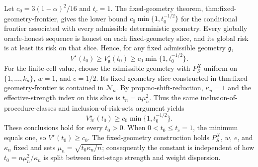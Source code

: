 Let \(c_0=3(1-\alpha)^2/16\) and \(t_c=1\).  The fixed-geometry theorem, thm:fixed-geometry-frontier, gives the lower bound \(c_0\min\{1,t_0^{-1/2}\}\) for the conditional frontier associated with every admissible deterministic geometry.  Every globally oracle-honest sequence is honest on each fixed-geometry slice, and its global risk is at least its risk on that slice.  Hence, for any fixed admissible geometry \(\mathfrak g\),
\[
 V^\star(t_0)\ge V_{\mathfrak g}^\star(t_0)\ge c_0\min\{1,t_0^{-1/2}\}.
\]
For the finite-cell value, choose the admissible geometry with \(P_S^X\) uniform on \(\{1,\ldots,k_n\}\), \(w=1\), and \(e=1/2\).  Its fixed-geometry slice constructed in thm:fixed-geometry-frontier is contained in \(\mathcal N_n\).  By prop:no-shift-reduction, \(\kappa_n=1\) and the effective-strength index on this slice is \(t_n=n\mu_n^2\).  Thus the same inclusion-of-procedure-classes and inclusion-of-risk-sets argument yields
\[
 V_{\mathcal N}^\star(t_0)\ge c_0\min\{1,t_0^{-1/2}\}.
\]
These conclusions hold for every \(t_0>0\).  When \(0<t_0\le t_c=1\), the minimum equals one, so \(V^\star(t_0)\ge c_0\).  The fixed-geometry construction holds \(P_S^X\), \(w\), \(e\), and \(\kappa_n\) fixed and sets \(\mu_n=\sqrt{t_0\kappa_n/n}\); consequently the constant is independent of how \(t_0=n\mu_n^2/\kappa_n\) is split between first-stage strength and weight dispersion.